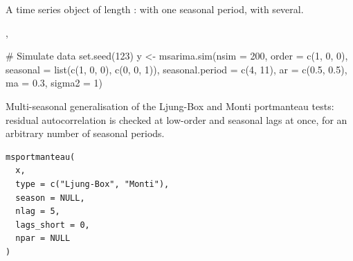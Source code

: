 \documentclass[a4paper]{book}
\begin{document}
%
\begin{Value}
A time series object of length :  with one seasonal period,
 with several.
\end{Value}
%
\begin{SeeAlso}
, 
\end{SeeAlso}
%
\begin{Examples}
\begin{ExampleCode}
# Simulate data
set.seed(123)
y <- msarima.sim(nsim = 200,
                 order = c(1, 0, 0),
                 seasonal = list(c(1, 0, 0), c(0, 0, 1)),
                 seasonal.period = c(4, 11),
                 ar = c(0.5, 0.5), ma = 0.3, sigma2 = 1)

\end{ExampleCode}
\end{Examples}
%
\begin{Description}
Multi-seasonal generalisation of the Ljung-Box and Monti portmanteau tests:
residual autocorrelation is checked at low-order and seasonal lags at once,
for an arbitrary number of seasonal periods.
\end{Description}
%
\begin{Usage}
\begin{verbatim}
msportmanteau(
  x,
  type = c("Ljung-Box", "Monti"),
  season = NULL,
  nlag = 5,
  lags_short = 0,
  npar = NULL
)
\end{verbatim}
\end{Usage}
%
\end{document}
